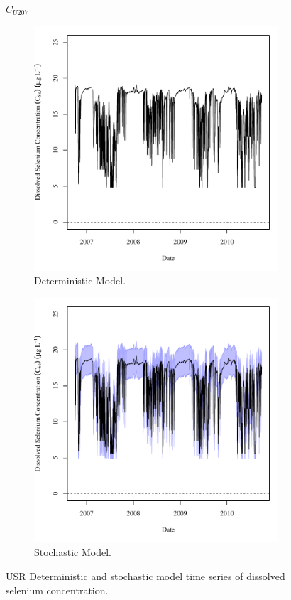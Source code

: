 \subfiguremid
\begin{landscape}
	\begin{figure}
		$ C_{U207} $
		\begin{subfigure}{0.7\textwidth}
			\centering
			\includegraphics[width=\tableCustomSize]{"Figures/Results_USR/Deterministic/c TS HRC"}
			\caption{Deterministic Model.}
		\end{subfigure}%
		\begin{subfigure}{0.7\textwidth}
			\centering
			\includegraphics[width=\tableCustomSize]{"Figures/Results_USR/Stochastic/c TS HRC"}
			\caption{Stochastic Model.}
		\end{subfigure}
		\caption{USR Deterministic and stochastic model time series of dissolved selenium concentration.}
	\end{figure}
\end{landscape}

